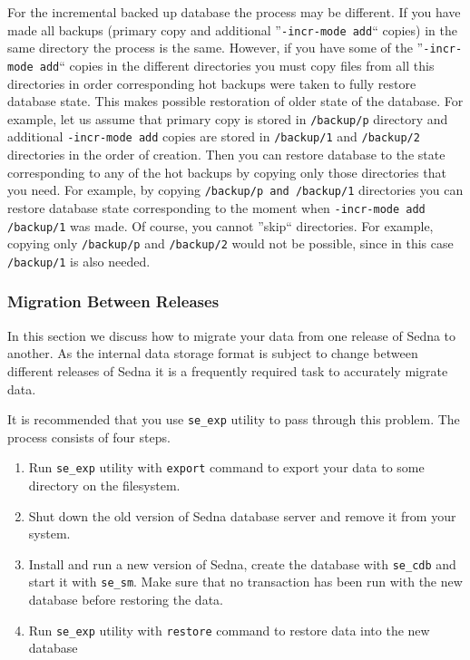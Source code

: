 \documentclass[a4paper,12pt]{article}
\begin{document}
For the incremental backed up database the process may be different. If you have made all backups (primary copy and
additional ''\verb!-incr-mode add!`` copies) in the same directory the process is the same. However, if you have some of the
''\verb!-incr-mode add!`` copies in the different directories you must copy files from all this directories
in order corresponding hot backups were taken to fully restore
database state. This makes possible restoration of older state of the database. For example, let us assume
that primary copy is stored in \verb!/backup/p! directory and additional \verb!-incr-mode add! copies are stored in
\verb!/backup/1! and \verb!/backup/2! directories in the order of creation. Then you can restore
database to the state corresponding to any of the hot backups by copying only those directories that you need.
For example, by copying \verb!/backup/p and !\verb!/backup/1! directories you can restore database state corresponding
to the moment when \verb!-incr-mode add /backup/1! was made. Of course, you cannot ''skip`` directories. For example,
copying only \verb!/backup/p! and \verb!/backup/2! would not be possible, since in this case \verb!/backup/1! is also
needed.

\subsubsection{Migration Between Releases}
\label{sec:release-migr}
In this section we discuss how to migrate your data from one release of Sedna to another.
As the internal data storage format is subject to change between different releases of Sedna it is a
frequently required task to accurately migrate data.

It is recommended that you use \verb!se_exp! utility to pass through this problem. The process
consists of four steps.

\begin{enumerate}
\item
Run \verb!se_exp! utility with \verb!export! command to export your data to some
directory on the filesystem.
\item
Shut down the old version of Sedna database server and remove it from your system.
\item
Install and run a new version of Sedna, create the database with \verb!se_cdb! and start it with
\verb!se_sm!. Make sure that no transaction has been run with the new database before restoring
the data.
\item
Run \verb!se_exp! utility with \verb!restore! command to restore data into the new database
\end{enumerate}
\end{document}
